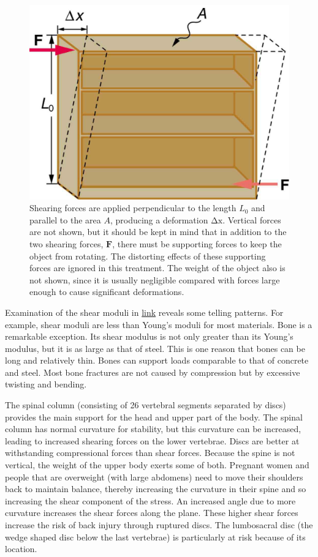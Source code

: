 \documentclass[
]{book}
\begin{document}
\begin{figure}
\hypertarget{import-auto-id1165296375245}{%
\centering
\includegraphics{images/Figure_06_03_06a.jpg}
\caption{Shearing forces are applied perpendicular to the length \(L_{\text{0}}\)
and parallel to the area \(A\), producing a deformation \(\text{Δx}\).
Vertical forces are not shown, but it should be kept in mind that in
addition to the two shearing forces, \(\textbf{F}{}\), there must be
supporting forces to keep the object from rotating. The distorting
effects of these supporting forces are ignored in this treatment. The
weight of the object also is not shown, since it is usually negligible
compared with forces large enough to cause significant
deformations.}\label{import-auto-id1165296375245}
}
\end{figure}

Examination of the shear moduli in
\protect\hyperlink{import-auto-id1165298671576}{link} reveals
some telling patterns. For example, shear moduli are less than Young's
moduli for most materials. Bone is a remarkable exception. Its shear
modulus is not only greater than its Young's modulus, but it is as
large as that of steel. This is one reason that bones can be long and
relatively thin. Bones can support loads comparable to that of concrete
and steel. Most bone fractures are not caused by compression but by
excessive twisting and bending.

The spinal column (consisting of 26 vertebral segments separated by
discs) provides the main support for the head and upper part of the
body. The spinal column has normal curvature for stability, but this
curvature can be increased, leading to increased shearing forces on the
lower vertebrae. Discs are better at withstanding compressional forces
than shear forces. Because the spine is not vertical, the weight of the
upper body exerts some of both. Pregnant women and people that are
overweight (with large abdomens) need to move their shoulders back to
maintain balance, thereby increasing the curvature in their spine and so
increasing the shear component of the stress. An increased angle due to
more curvature increases the shear forces along the plane. These higher
shear forces increase the risk of back injury through ruptured discs.
The lumbosacral disc (the wedge shaped disc below the last vertebrae) is
particularly at risk because of its location.
\end{document}
